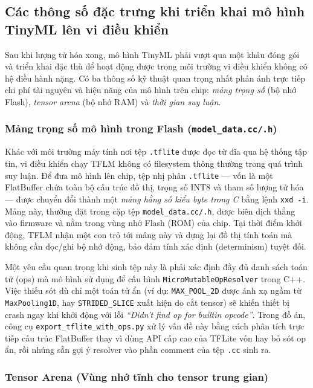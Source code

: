 \documentclass[../DoAn.tex]{subfiles}
\begin{document}
\subsection{Các thông số đặc trưng khi triển khai mô hình TinyML lên vi điều khiển}
\label{subsection:3.4.5}

Sau khi lượng tử hóa xong, mô hình TinyML phải vượt qua một khâu đóng gói và triển khai đặc thù để hoạt động được trong môi trường vi điều khiển không có hệ điều hành nặng. Có ba thông số kỹ thuật quan trọng nhất phản ánh trực tiếp chi phí tài nguyên và hiệu năng của mô hình trên chip: \textit{mảng trọng số} (bộ nhớ Flash), \textit{tensor arena} (bộ nhớ RAM) và \textit{thời gian suy luận}.

\subsubsection*{Mảng trọng số mô hình trong Flash (\texttt{model\_data.cc/.h})}

Khác với môi trường máy tính nơi tệp \texttt{.tflite} được đọc từ đĩa qua hệ thống tập tin, vi điều khiển chạy TFLM không có filesystem thông thường trong quá trình suy luận. Để đưa mô hình lên chip, tệp nhị phân \texttt{.tflite} --- vốn là một FlatBuffer chứa toàn bộ cấu trúc đồ thị, trọng số INT8 và tham số lượng tử hóa --- được chuyển đổi thành một \textit{mảng hằng số kiểu byte trong C} bằng lệnh \texttt{xxd -i}. Mảng này, thường đặt trong cặp tệp \texttt{model\_data.cc/.h}, được biên dịch thẳng vào firmware và nằm trong vùng nhớ Flash (ROM) của chip. Tại thời điểm khởi động, TFLM nhận một con trỏ tới mảng này và dựng lại đồ thị tính toán mà không cần đọc/ghi bộ nhớ động, bảo đảm tính xác định (determinism) tuyệt đối.

Một yêu cầu quan trọng khi sinh tệp này là phải xác định đầy đủ danh sách toán tử (ops) mà mô hình sử dụng để cấu hình \texttt{MicroMutableOpResolver} trong C++. Việc thiếu sót dù chỉ một toán tử ẩn (ví dụ: \texttt{MAX\_POOL\_2D} được ánh xạ ngầm từ \texttt{MaxPooling1D}, hay \texttt{STRIDED\_SLICE} xuất hiện do cắt tensor) sẽ khiến thiết bị crash ngay khi khởi động với lỗi \textit{``Didn't find op for builtin opcode''}. Trong đồ án, công cụ \texttt{export\_tflite\_with\_ops.py} xử lý vấn đề này bằng cách phân tích trực tiếp cấu trúc FlatBuffer thay vì dùng API cấp cao của TFLite vốn hay bỏ sót op ẩn, rồi nhúng sẵn gợi ý resolver vào phần comment của tệp \texttt{.cc} sinh ra.

\subsubsection*{Tensor Arena (Vùng nhớ tĩnh cho tensor trung gian)}
\end{document}
